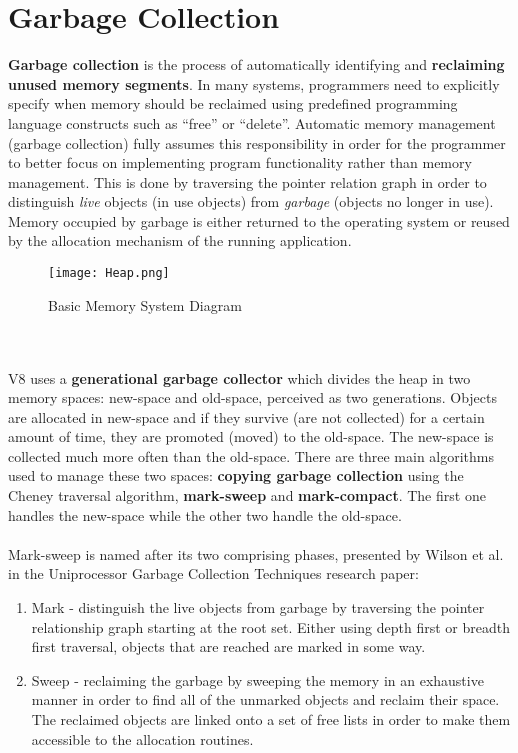 \documentclass{l4proj}
\begin{document}
\section{Garbage Collection}
\label{gcexplained}
\hspace*{1em}\textbf{Garbage collection} is the process of automatically identifying and \textbf{reclaiming unused memory segments}. In many systems, programmers need to explicitly specify when memory should be reclaimed using predefined programming language constructs such as ``free'' or ``delete''. Automatic memory management (garbage collection) fully assumes this responsibility in order for the programmer to better focus on implementing program functionality rather than memory management. This is done by traversing the pointer relation graph in order to distinguish \textit{live} objects (in use objects) from \textit{garbage} (objects no longer in use). Memory occupied by garbage is either returned to the operating system or reused by the allocation mechanism of the running application\cite{gcpaper}.%
\begin{figure}[!ht]
  \centering
    \texttt{[image: Heap.png]}
    \caption{Basic Memory System Diagram}
\end{figure}
\\\\
\hspace*{1em} V8 uses a \textbf{generational garbage collector} which divides the heap in two memory spaces: new-space and old-space, perceived as two generations. Objects are allocated in new-space and if they survive (are not collected) for a certain amount of time, they are promoted (moved) to the old-space. The new-space is collected much more often than the old-space. There are three main algorithms used to manage these two spaces: \textbf{copying garbage collection} using the Cheney traversal algorithm\cite{cheney}, \textbf{mark-sweep} and \textbf{mark-compact}. The first one handles the new-space while the other two handle the old-space. 
\\\\
Mark-sweep is named after its two comprising phases, presented by Wilson et al. in the Uniprocessor Garbage Collection Techniques research paper\cite{gcpaper}: 
\begin{enumerate}
\item Mark - distinguish the live objects from garbage by traversing the pointer relationship graph starting at the root set. Either using depth first or breadth first traversal, objects that are reached are marked in some way.

\item Sweep - reclaiming the garbage by sweeping the memory in an exhaustive manner in order to find all of the unmarked objects and reclaim their space. The reclaimed objects are linked onto a set of free lists in order to make them accessible to the allocation routines.
\end{enumerate}
\end{document}
